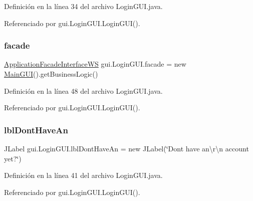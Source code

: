 Definición en la línea 34 del archivo Login\+G\+U\+I.\+java.



Referenciado por gui.\+Login\+G\+U\+I.\+Login\+G\+U\+I().

\mbox{\label{classgui_1_1_login_g_u_i_a4abc22d6221d58bce5352dbe85b2d174}} 
\subsubsection{\texorpdfstring{facade}{facade}}
{\footnotesize\ttfamily \mbox{\hyperlink{interfacebusiness_logic_1_1_application_facade_interface_w_s}{Application\+Facade\+Interface\+WS}} gui.\+Login\+G\+U\+I.\+facade = new \mbox{\hyperlink{classgui_1_1_main_g_u_i}{Main\+G\+UI}}().get\+Business\+Logic()\hspace{0.3cm}{\ttfamily [private]}}



Definición en la línea 48 del archivo Login\+G\+U\+I.\+java.



Referenciado por gui.\+Login\+G\+U\+I.\+Login\+G\+U\+I().

\mbox{\label{classgui_1_1_login_g_u_i_a7b7b08f790b49e4969565f9ba2395f3a}} 
\subsubsection{\texorpdfstring{lblDontHaveAn}{lblDontHaveAn}}
{\footnotesize\ttfamily J\+Label gui.\+Login\+G\+U\+I.\+lbl\+Dont\+Have\+An = new J\+Label(\char`\"{}Dont have an\textbackslash{}r\textbackslash{}n account yet?\char`\"{})\hspace{0.3cm}{\ttfamily [private]}}



Definición en la línea 41 del archivo Login\+G\+U\+I.\+java.



Referenciado por gui.\+Login\+G\+U\+I.\+Login\+G\+U\+I().

\mbox{\label{classgui_1_1_login_g_u_i_a575f68f00124a219bbc169d4c62f5f5d}} 
